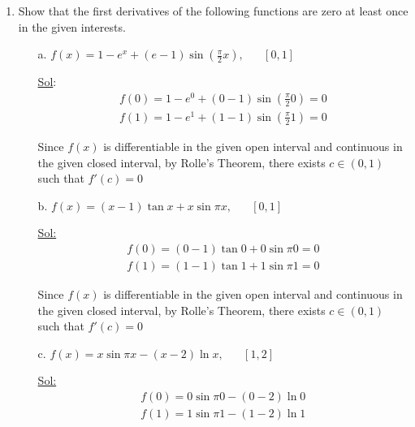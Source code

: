 \begin{enumerate}
\begin{itemize}
    \end{itemize}

  \item Show that the first derivatives of the following functions
    are zero at least once in the given interests.
    \begin{itemize}
      \item[a.] $f(x) = 1-e^x + (e - 1) \sin(\frac{\pi}{2} x),
        \hspace{20pt} [0, 1]$

        \underline{Sol}:\\
        $$
        \begin{array}{l}
          f(0) = 1-e^0 + (0 - 1) \sin(\frac{\pi}{2} 0) = 0 \\
          f(1) = 1-e^1 + (1 - 1) \sin(\frac{\pi}{2} 1) = 0
        \end{array}
        $$

        Since $f(x)$ is differentiable in the given open interval and
        continuous in the given closed interval, by Rolle's Theorem,
        there exists $c \in (0, 1)$ such that $f'(c) = 0$

        \bigbreak

      \item[b.] $f(x) = (x-1) \tan x + x \sin \pi x, \hspace{20pt} [0, 1]$

        \underline{Sol:}\\
        $$
        \begin{array}{l}
          f(0) = (0-1) \tan 0 + 0 \sin \pi 0 = 0 \\
          f(1) = (1-1) \tan 1 + 1 \sin \pi 1 = 0
        \end{array}
        $$

        Since $f(x)$ is differentiable in the given open interval and
        continuous in the given closed interval, by Rolle's Theorem,
        there exists $c \in (0, 1)$ such that $f'(c) = 0$

        \bigbreak
      \item[c.] $f(x) = x \sin \pi x - (x-2) \ln x, \hspace{20pt} [1, 2]$

        \underline{Sol:}\\
        $$
        \begin{array}{l}
          f(0) = 0 \sin \pi 0 - (0-2) \ln 0 \\
          f(1) = 1 \sin \pi 1 - (1-2) \ln 1
        \end{array}
        $$


\end{itemize}
\end{enumerate}

